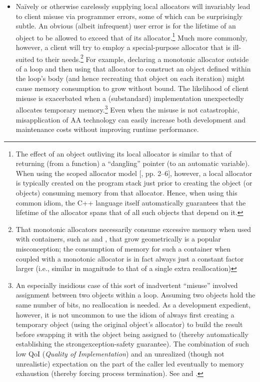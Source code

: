 \begin{itemize}
\item Naïvely or otherwise carelessly supplying local allocators will invariably lead to
client misuse via programmer errors, some of which can be surprisingly
subtle. An obvious (albeit infrequent) user error is for the lifetime of an object
to be allowed to exceed that of its allocator.\footnote{The effect of an object outliving its local allocator is similar to that of returning (from a function) a
“dangling” pointer (to an automatic variable). When using the scoped allocator model [\cite{halpern08}, pp.
2–6], however, a local allocator is typically created on the program stack just prior to creating the
object (or objects) consuming memory from that allocator. Hence, when using this common idiom, the
C++ language itself automatically guarantees that the lifetime of the allocator spans that of all such
objects that depend on it.} Much more commonly, however,
a client will try to employ a special-purpose allocator that is ill-suited to their
needs.\footnote{That monotonic allocators necessarily consume excessive memory when used with containers, such
as  and , that grow geometrically is a popular misconception; the
consumption of memory for such a container when coupled with a monotonic allocator is in fact
always just a constant factor larger (i.e., similar in magnitude to that of a single extra reallocation)}
For example, declaring a monotonic allocator outside of a loop and
then using that allocator to construct an object defined within the loop’s body
(and hence recreating that object on each iteration) might cause memory
consumption to grow without bound. The likelihood of client misuse is
exacerbated when a (substandard) implementation unexpectedly allocates
temporary memory.\footnote{An especially insidious case of this sort of inadvertent “misuse” involved assignment between two
 objects within a loop. Assuming two  objects hold the same number of bits, no
reallocation is needed. As a development expedient, however, it is not uncommon to use the idiom of
always first creating a temporary object (using the original object’s allocator) to build the result before
swapping it with the object being assigned to (thereby automatically establishing the strongexception-safety
guarantee). The combination of such low QoI (\emph{Quality of Implementation}) and an
unrealized (though not unrealistic) expectation on the part of the caller led eventually to memory
exhaustion (thereby forcing process termination). See \cite{halpern20a} and \cite{halpern20b}.} Even
when the misuse is not catastrophic,
misapplication of AA technology can easily increase both development and
maintenance costs without improving runtime performance.


\end{itemize}
